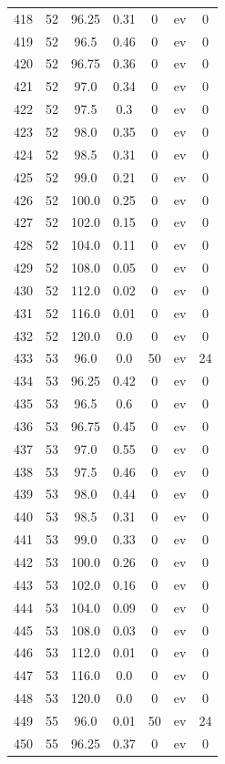 \documentclass[12pt,a4paper]{article}
\begin{document}
\begin{tabular}{r|cccccc}
	418 & 52 & 96.25 & 0.31 & 0 & ev & 0 \\
	419 & 52 & 96.5 & 0.46 & 0 & ev & 0 \\
	420 & 52 & 96.75 & 0.36 & 0 & ev & 0 \\
	421 & 52 & 97.0 & 0.34 & 0 & ev & 0 \\
	422 & 52 & 97.5 & 0.3 & 0 & ev & 0 \\
	423 & 52 & 98.0 & 0.35 & 0 & ev & 0 \\
	424 & 52 & 98.5 & 0.31 & 0 & ev & 0 \\
	425 & 52 & 99.0 & 0.21 & 0 & ev & 0 \\
	426 & 52 & 100.0 & 0.25 & 0 & ev & 0 \\
	427 & 52 & 102.0 & 0.15 & 0 & ev & 0 \\
	428 & 52 & 104.0 & 0.11 & 0 & ev & 0 \\
	429 & 52 & 108.0 & 0.05 & 0 & ev & 0 \\
	430 & 52 & 112.0 & 0.02 & 0 & ev & 0 \\
	431 & 52 & 116.0 & 0.01 & 0 & ev & 0 \\
	432 & 52 & 120.0 & 0.0 & 0 & ev & 0 \\
	433 & 53 & 96.0 & 0.0 & 50 & ev & 24 \\
	434 & 53 & 96.25 & 0.42 & 0 & ev & 0 \\
	435 & 53 & 96.5 & 0.6 & 0 & ev & 0 \\
	436 & 53 & 96.75 & 0.45 & 0 & ev & 0 \\
	437 & 53 & 97.0 & 0.55 & 0 & ev & 0 \\
	438 & 53 & 97.5 & 0.46 & 0 & ev & 0 \\
	439 & 53 & 98.0 & 0.44 & 0 & ev & 0 \\
	440 & 53 & 98.5 & 0.31 & 0 & ev & 0 \\
	441 & 53 & 99.0 & 0.33 & 0 & ev & 0 \\
	442 & 53 & 100.0 & 0.26 & 0 & ev & 0 \\
	443 & 53 & 102.0 & 0.16 & 0 & ev & 0 \\
	444 & 53 & 104.0 & 0.09 & 0 & ev & 0 \\
	445 & 53 & 108.0 & 0.03 & 0 & ev & 0 \\
	446 & 53 & 112.0 & 0.01 & 0 & ev & 0 \\
	447 & 53 & 116.0 & 0.0 & 0 & ev & 0 \\
	448 & 53 & 120.0 & 0.0 & 0 & ev & 0 \\
	449 & 55 & 96.0 & 0.01 & 50 & ev & 24 \\
	450 & 55 & 96.25 & 0.37 & 0 & ev & 0 \\

\end{tabular}
\end{document}
